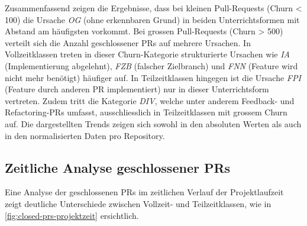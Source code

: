 \newpage
Zusammenfassend zeigen die Ergebnisse, dass bei kleinen Pull-Requests (Churn < 100) die Ursache \textit{OG} (ohne erkennbaren Grund) in beiden Unterrichtsformen mit Abstand am häufigsten vorkommt. Bei grossen Pull-Requests (Churn > 500) verteilt sich die Anzahl geschlossener PRs auf mehrere Ursachen. In Vollzeitklassen treten in dieser Churn-Kategorie strukturierte Ursachen wie \textit{IA} (Implementierung abgelehnt), \textit{FZB} (falscher Zielbranch) und \textit{FNN} (Feature wird nicht mehr benötigt) häufiger auf. In Teilzeitklassen hingegen ist die Ursache \textit{FPI} (Feature durch anderen PR implementiert) nur in dieser Unterrichtsform vertreten. Zudem tritt die Kategorie \textit{DIV}, welche unter anderem Feedback- und Refactoring-PRs umfasst, ausschliesslich in Teilzeitklassen mit grossem Churn auf. Die dargestellten Trends zeigen sich sowohl in den absoluten Werten als auch in den normalisierten Daten pro Repository.

\subsection{Zeitliche Analyse geschlossener PRs}

Eine Analyse der geschlossenen PRs im zeitlichen Verlauf der Projektlaufzeit zeigt deutliche Unterschiede zwischen Vollzeit- und Teilzeitklassen, wie in \autoref{fig:closed-prs-projektzeit} ersichtlich.

